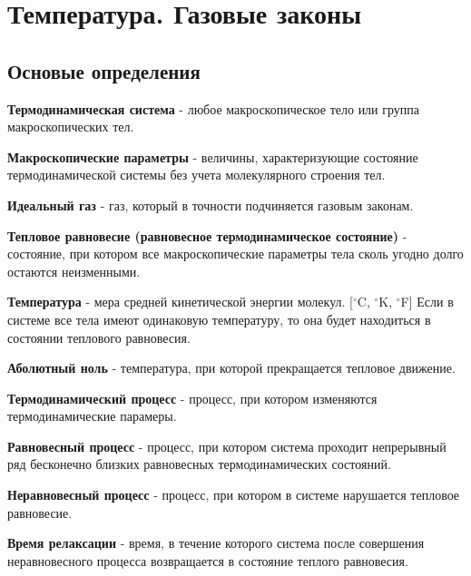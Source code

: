 \section{Температура. Газовые законы}



\subsection{Основые определения}
\textbf{Термодинамическая система} - любое макроскопическое тело или группа макроскопических тел.\par
\textbf{Макроскопические параметры} - величины, характеризующие состояние термодинамической системы без учета молекулярного строения тел.\par
\textbf{Идеальный газ} - газ, который в точности подчиняется газовым законам.\par
\textbf{Тепловое равновесие (равновесное термодинамическое состояние)} - состояние, при котором все макроскопические параметры тела сколь угодно долго остаются неизменными.\par
\textbf{Температура} - мера средней кинетической энергии молекул. [$^\circ$C, $^\circ$K, $^\circ$F] Если в системе все тела имеют одинаковую температуру, то она будет находиться в состоянии теплового равновесия.\par
\textbf{Аболютный ноль} - температура, при которой прекращается тепловое движение.\par

\textbf{Термодинамический процесс} - процесс, при котором изменяются термодинамические парамеры.\par
\textbf{Равновесный процесс} - процесс, при котором система проходит непрерывный ряд бесконечно близких равновесных термодинамических состояний.\par
\textbf{Неравновесный процесс} - процесс, при котором в системе нарушается тепловое равновесие.\par
\textbf{Время релаксации} - время, в течение которого система после совершения неравновесного процесса возвращается в состояние теплого равновесия.\par



